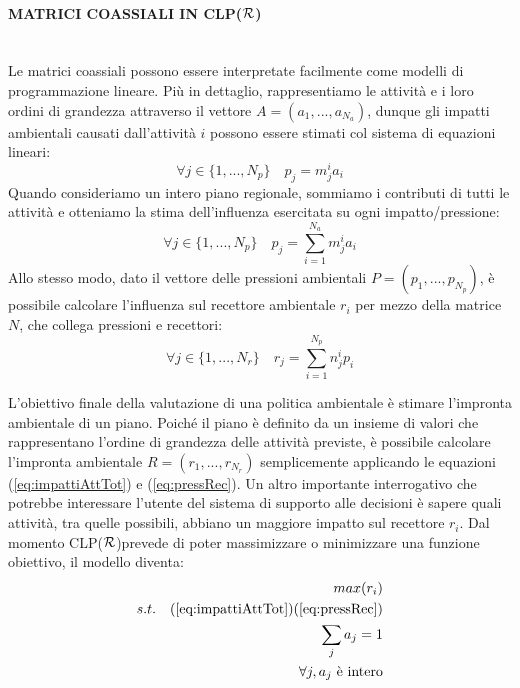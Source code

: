 \documentclass[12pt,a4paper,openright,twoside]{report}
\newcommand{\myparagraph}[1]{\paragraph{#1}\mbox{}\\}
\newcommand{\clpr}{CLP({\ensuremath{\cal R}})}
\begin{document}
\myparagraph{MATRICI COASSIALI IN \clpr}
Le matrici coassiali possono essere interpretate facilmente come modelli di programmazione lineare. Più in dettaglio, rappresentiamo le attività e i loro ordini di grandezza attraverso il vettore $A = (a_1,...,a_{N_a})$, dunque gli impatti ambientali causati dall'attività $i$ possono essere stimati col sistema di equazioni lineari:
\begin{equation}
\label{eq:impattiAtt}
	\forall j \in \{1,...,N_p\}  \quad p_j = m_j^i a_i
\end{equation}
Quando consideriamo un intero piano regionale, sommiamo i contributi di tutti le attività e otteniamo la stima dell'influenza esercitata su ogni impatto/pressione:
\begin{equation}
\label{eq:impattiAttTot}
	\forall j \in \{1,...,N_p\}  \quad  p_j = \sum_{i=1}^{N_a} m_j^i a_i
\end{equation}
Allo stesso modo, dato il vettore delle pressioni ambientali $P = (p_1,...,p_{N_p})$, è possibile calcolare l'influenza sul recettore ambientale $r_i$ per mezzo della matrice $N$, che collega pressioni e recettori:
\begin{equation}
\label{eq:pressRec}
	\forall j \in \{1,...,N_r\}  \quad  r_j = \sum_{i=1}^{N_p} n_j^i p_i
\end{equation}

L'obiettivo finale della valutazione di una politica ambientale è stimare l'impronta ambientale di un piano. Poiché il piano è definito da un insieme di valori che rappresentano l'ordine di grandezza delle attività previste, è possibile calcolare l'impronta ambientale $R = (r_1,...,r_{N_r})$ semplicemente applicando le equazioni (\ref{eq:impattiAttTot}) e (\ref{eq:pressRec}).
Un altro importante interrogativo che potrebbe interessare l'utente del sistema di supporto alle decisioni è sapere quali attività, tra quelle possibili, abbiano un maggiore impatto sul recettore $r_i$. Dal momento \clpr prevede di poter massimizzare o minimizzare una funzione obiettivo, il modello diventa:
\begin{equation}
\label{eq:impactOnGivenRec}
	\begin{aligned}
		max(r_i) \\
		s.t.  \quad (\ref{eq:impattiAttTot}) (\ref{eq:pressRec}) \\
		\sum_j a_j = 1 \\
		\forall j, a_j \mbox{ è intero} 
	\end{aligned}
\end{equation}
\end{document}

